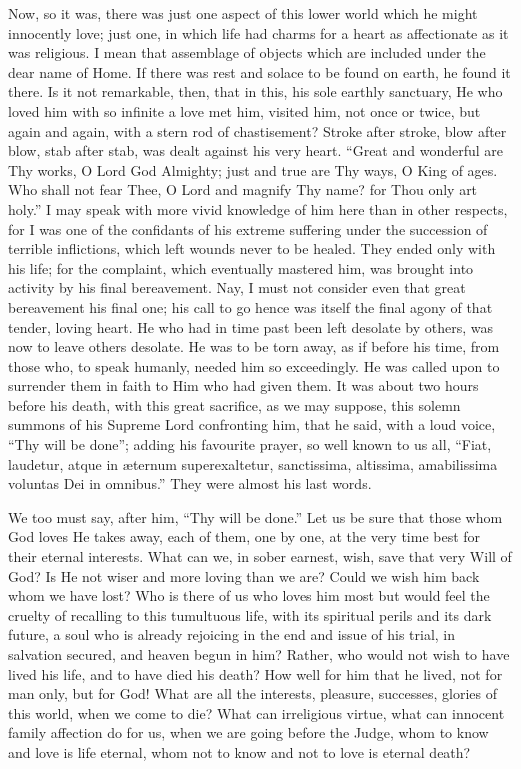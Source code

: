 Now, so it was, there was just one aspect of this
lower world which he might innocently love; just one, in
which life had charms for a heart as affectionate as it
was religious. I mean that assemblage of objects which
are included under the dear name of Home. If there was
rest and solace to be found on earth, he found it there.
Is it not remarkable, then, that in this, his sole
earthly sanctuary, He who loved him with so infinite a
love met him, visited him, not once or twice, but again
and again, with a stern rod of chastisement? Stroke after
stroke, blow after blow, stab after stab, was dealt
against his very heart. ``Great and wonderful are Thy
works, O Lord God Almighty; just and true are Thy ways, O
King of ages. Who shall not fear Thee, O Lord and magnify
Thy name? for Thou only art holy.'' I may speak with
more vivid knowledge of him here than in other respects,
for I was one of the confidants of his extreme suffering
under the succession of terrible inflictions, which left
wounds never to be healed. They ended only with his life;
for the complaint, which eventually mastered him, was
brought into activity by his final bereavement. Nay, I
must not consider even that great bereavement his final
one; his call to go hence was itself the final agony of
that tender, loving heart. He who had in time past been
left desolate by others, was now to leave others
desolate. He was to be torn away, as if before his time,
from those who, to speak humanly, needed him so
exceedingly. He was called upon to surrender them in
faith to Him who had given them. It was about two hours
before his death, with this great sacrifice, as we may
suppose, this solemn summons of his Supreme Lord
confronting him, that he said, with a loud voice,
``Thy will be done''; adding his favourite
prayer, so well known to us all, ``Fiat, laudetur,
atque in æternum superexaltetur, sanctissima, altissima,
amabilissima voluntas Dei in omnibus.'' They were
almost his last words.

We too must say, after him, ``Thy will be
done.'' Let us be sure that those whom God loves He
takes away, each of them, one by one, at the very time
best for their eternal interests. What can we, in sober
earnest, wish, save that very Will of God? Is He not
wiser and more loving than we are? Could we wish him back
whom we have lost? Who is there of us who loves him most
but would feel the cruelty of recalling to this
tumultuous life, with its spiritual perils and its dark
future, a soul who is already rejoicing in the end and
issue of his trial, in salvation secured, and heaven
begun in him? Rather, who would not wish to have lived
his life, and to have died his death? How well for him
that he lived, not for man only, but for God! What are
all the interests, pleasure, successes, glories of this
world, when we come to die? What can irreligious virtue,
what can innocent family affection do for us, when we are
going before the Judge, whom to know and love is life
eternal, whom not to know and not to love is eternal
death?


